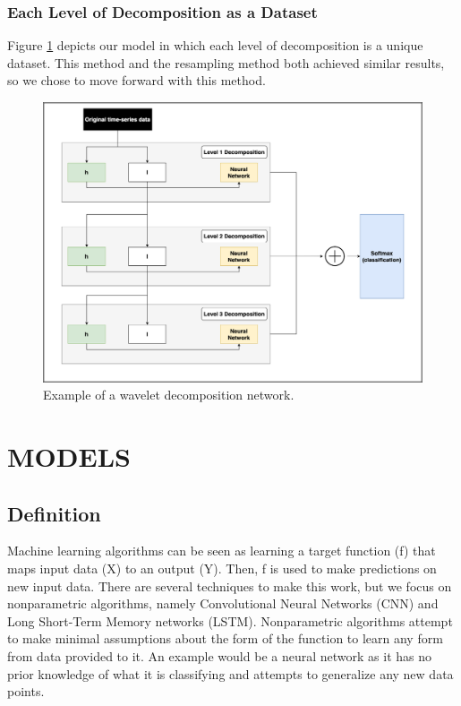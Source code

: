 \documentclass{turabian-thesis}[12pt]
\begin{document}
\subsection{Each Level of Decomposition as a Dataset}
Figure \ref{fig:wavelet_decomp} depicts our model in which each level of decomposition is a unique dataset. This method and the resampling method both achieved similar results, so we chose to move forward with this method.



\begin{figure}[h!]
   \begin{center}
      \includegraphics[scale=0.35]{../media/wavelet_decomp.png}
   \end{center}
   \caption{Example of a wavelet decomposition network.}
   \label{fig:wavelet_decomp}
\end{figure}


\chapter{MODELS}
\label{chap:models}



\section{Definition}
Machine learning algorithms can be seen as learning a target function (f) that maps input data (X) to an output (Y). Then, f is used to make predictions on new input data. There are several techniques to make this work, but we focus on nonparametric algorithms, namely Convolutional Neural Networks (CNN) and Long Short-Term Memory networks (LSTM). Nonparametric algorithms attempt to make minimal assumptions about the form of the function to learn any form from data provided to it. An example would be a neural network as it has no prior knowledge of what it is classifying and attempts to generalize any new data points.
\end{document}
